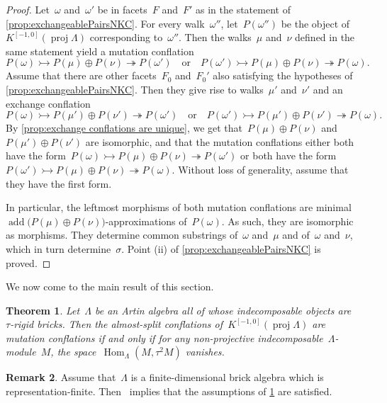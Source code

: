 \documentclass{amsart}
\newtheorem{theorem}{Theorem}[section]
\theoremstyle{definition}
\newtheorem{remark}[theorem]{Remark}
\newcommand{\Hom}[1]{\operatorname{Hom}_{#1}}
\newcommand{\add}{\operatorname{add}}
\newcommand{\proj}{\operatorname{proj}}
\newcommand{\infl}{\rightarrowtail}
\newcommand{\defl}{\twoheadrightarrow}
\begin{document}
\begin{proof}
Let~$\omega$ and~$\omega'$ be in facets~$F$ and~$F'$ as in the statement of \cref{prop:exchangeablePairsNKC}. For every walk~$\omega''$, let~$P(\omega'')$ be the object of~$K^{[-1,0]}(\proj \Lambda)$ corresponding to~$\omega''$. Then the walks~$\mu$ and~$\nu$ defined in the same statement yield a mutation conflation
\[
P(\omega) \infl P(\mu) \oplus P(\nu) \defl P(\omega') \quad \textrm{or} \quad P(\omega') \infl P(\mu) \oplus P(\nu) \defl P(\omega).
\]
Assume that there are other facets~$F_0$ and~$F_0'$ also satisfying the hypotheses of \cref{prop:exchangeablePairsNKC}. Then they give rise to walks~$\mu'$ and~$\nu'$ and an exchange conflation
\[
P(\omega) \infl P(\mu') \oplus P(\nu') \defl P(\omega') \quad \textrm{or} \quad P(\omega') \infl P(\mu') \oplus P(\nu') \defl P(\omega).
\]
By \cref{prop:exchange conflations are unique}, we get that~$P(\mu)\oplus P(\nu)$ and~$P(\mu')\oplus P(\nu')$ are isomorphic, and that the mutation conflations either both have the form~$P(\omega) \infl P(\mu) \oplus P(\nu) \defl P(\omega')$ or both have the form~$P(\omega') \infl P(\mu) \oplus P(\nu) \defl P(\omega)$. Without loss of generality, assume that they have the first form.
 
In particular, the leftmost morphisms of both mutation conflations are minimal ${\add \big( P(\mu) \oplus P(\nu) \big)}$-approximations of~$P(\omega)$. As such, they are isomorphic as morphisms. They determine common substrings of~$\omega$ and~$\mu$ and of~$\omega$ and~$\nu$, which in turn determine~$\sigma$. Point (ii) of \cref{prop:exchangeablePairsNKC} is proved.
\end{proof}

We now come to the main result of this section.

\begin{theorem}
\label{thm:brick-algebra-condition}
Let~$\Lambda$ be an Artin algebra all of whose indecomposable objects are ~$\tau$-rigid bricks. Then the almost-split conflations of~$K^{[-1,0]}(\proj \Lambda)$ are mutation conflations if and only if for any non-projective indecomposable~$\Lambda$-module~$M$, the space~$\Hom{\Lambda}(M, \tau^2 M)$ vanishes.
\end{theorem}

\begin{remark}
Assume that~$\Lambda$ is a finite-dimensional brick algebra which is representation-finite.
Then~\cite[Thm.~6.2]{DemonetIyamaJasso} implies that the assumptions of \cref{thm:brick-algebra-condition} are satisfied.
\end{remark}
\end{document}
